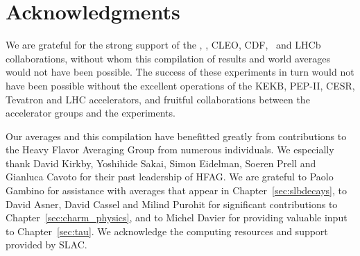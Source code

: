 \section{Acknowledgments}

We are grateful for the strong support of the \belle, 
\babar, CLEO, CDF, \dzero\ and LHCb collaborations, without whom 
this compilation of results and world averages would not have 
been possible. The success of these experiments in turn would 
not have been possible without the excellent operations of the 
KEKB, PEP-II, CESR, Tevatron and LHC accelerators, and fruitful 
collaborations between the accelerator groups and the experiments.

Our averages and this compilation have benefitted greatly from 
contributions to the Heavy Flavor Averaging Group from numerous
individuals. We especially thank David Kirkby, Yoshihide Sakai, 
Simon Eidelman, Soeren Prell and Gianluca Cavoto for their
past leadership of HFAG. 
We are grateful to Paolo Gambino for assistance with averages that appear in Chapter~\ref{sec:slbdecays},
to David Asner, David Cassel and Milind Purohit 
for significant contributions to Chapter~\ref{sec:charm_physics}, 
and to Michel Davier for providing valuable input to Chapter~\ref{sec:tau}.
We acknowledge the computing resources and support provided by SLAC.
